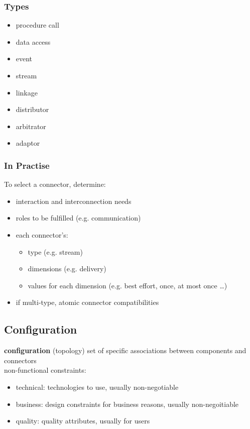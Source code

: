 \documentclass[]{article}
\theoremstyle{definition}
\begin{document}
	\subsubsection{Types}
	\begin{itemize}
		\item procedure call
		\item data access
		\item event
		\item stream
		\item linkage
		\item distributor
		\item arbitrator
		\item adaptor
	\end{itemize}

	\subsubsection{In Practise}
	To select a connector, determine:
	\begin{itemize}
		\item interaction and interconnection needs
		\item roles to be fulfilled (e.g. communication)
		\item each connector's:
			\begin{itemize}
				\item type (e.g. stream)
				\item dimensions (e.g. delivery)
				\item values for each dimension (e.g. best effort, once, at most once \dots)
			\end{itemize}
		\item if multi-type, atomic connector compatibilities
	\end{itemize}


	\subsection{Configuration}
	\textbf{configuration} (topology) set of specific associations between components and connectors \\

	non-functional constraints:
	\begin{itemize}
		\item technical: technologies to use, usually non-negotiable
		\item business: design constraints for business reasons, usually non-negoitiable
		\item quality: quality attributes, usually for users
	\end{itemize}
\end{document}
